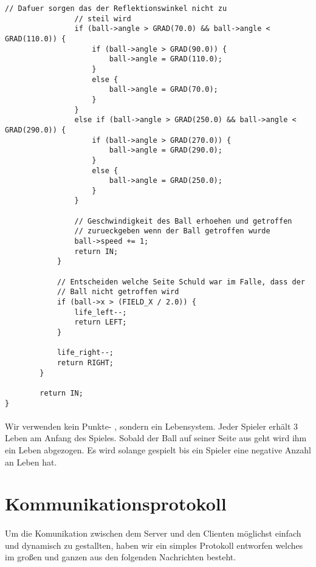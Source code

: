 \begin{lstlisting}[caption=Kernkomponeten der Spiellogik]
				// Dafuer sorgen das der Reflektionswinkel nicht zu
				// steil wird
				if (ball->angle > GRAD(70.0) && ball->angle < GRAD(110.0)) {
					if (ball->angle > GRAD(90.0)) {
						ball->angle = GRAD(110.0);
					}
					else {
						ball->angle = GRAD(70.0);
					}
				}
				else if (ball->angle > GRAD(250.0) && ball->angle < GRAD(290.0)) {
					if (ball->angle > GRAD(270.0)) {
						ball->angle = GRAD(290.0);
					}
					else {
						ball->angle = GRAD(250.0);
					}
				}

                // Geschwindigkeit des Ball erhoehen und getroffen
                // zurueckgeben wenn der Ball getroffen wurde
                ball->speed += 1;
                return IN;
            }
            
            // Entscheiden welche Seite Schuld war im Falle, dass der
            // Ball nicht getroffen wird
            if (ball->x > (FIELD_X / 2.0)) {
            	life_left--;
            	return LEFT;
            }

            life_right--;
            return RIGHT;
        }

        return IN;
}
\end{lstlisting}

\paragraph*{}
Wir verwenden kein Punkte- , sondern ein Lebensystem. Jeder Spieler erhält 3 Leben am Anfang des Spieles. Sobald der Ball auf seiner Seite aus geht wird ihm ein Leben abgezogen. Es wird solange gespielt bis ein Spieler eine negative Anzahl an Leben hat.  

\newpage
\section*{Kommunikationsprotokoll}

\paragraph*{}
Um die Komunikation zwischen dem Server und den Clienten möglichst einfach und dynamisch zu gestallten, haben wir ein simples Protokoll entworfen welches im großen und ganzen aus den folgenden Nachrichten besteht.

\lstset{
	frame=none,
	}


